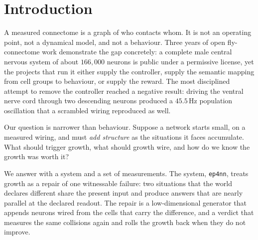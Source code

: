 \documentclass[11pt]{article}
\theoremstyle{remark}
\begin{document}
\begin{abstract}
gate of $0.05$, the best spread is $0.0397$, and the largest absolute cosine between two context answers
that must differ is at least $0.9979$ at every point. At the best point the answers span a cone of
$1.45$ degrees with $99.95$ percent of their energy in one singular direction and a rank-one residual of
$2.3$ percent, and none of ten declared readouts separates the pairs, so the failure belongs to the
substrate and its operating point rather than to a single declaration. Capacity growth is therefore not the binding
constraint, and a growth study on this pair would measure an uninformative object. We conclude
that structural growth studies must publish the prerequisite measurement alongside the growth
result, and we give a receipt format that makes such claims comparable across connectome
projects. All numbers in this paper are produced by the accompanying probes.

\vspace{6pt}
\noindent\textbf{Keywords:} structural plasticity; equilibrium networks; connectome; worm
wiring; contraction certificate; negative results; reproducibility receipts.
\end{abstract}

\tableofcontents

\section{Introduction}

A measured connectome is a graph of who contacts whom. It is not an operating point, not a
dynamical model, and not a behaviour. Three years of open fly-connectome work demonstrate the gap
concretely: a complete male central nervous system of about $166{,}000$ neurons is public under a
permissive license, yet the projects that run it either supply the controller, supply the
semantic mapping from cell groups to behaviour, or supply the reward. The most disciplined
attempt to remove the controller reached a negative result: driving the ventral nerve cord
through two descending neurons produced a $45.5$\,Hz population oscillation that a scrambled
wiring reproduced as well.

Our question is narrower than behaviour. Suppose a network starts small, on a measured wiring,
and must \emph{add structure} as the situations it faces accumulate. What should trigger growth,
what should growth wire, and how do we know the growth was worth it?

We answer with a system and a set of measurements. The system, \texttt{ep4nn}, treats growth as a
repair of one witnessable failure: two situations that the world declares different share the
present input and produce answers that are nearly parallel at the declared readout. The repair is
a low-dimensional generator that appends neurons wired from the cells that carry the difference,
and a verdict that measures the same collisions again and rolls the growth back when they do not
improve.
\end{document}
